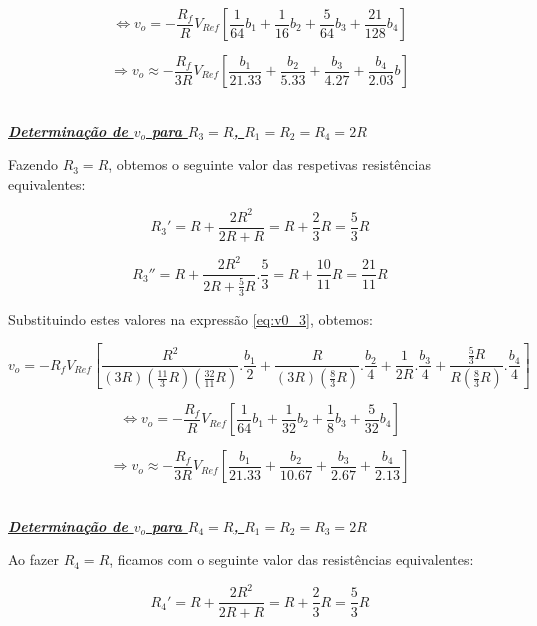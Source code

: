 \documentclass[a4paper,11pt]{report}
\begin{document}
$$\Leftrightarrow v_o=-\frac{R_f}{R}V_{Ref}\left[\frac{1}{64}b_1+\frac{1}{16}b_2+\frac{5}{64}b_3+\frac{21}{128}b_4\right]$$

\begin{equation}\label{eq:v0_2R}
\Rightarrow v_o \approx -\frac{R_f}{3R}V_{Ref}\left[\frac{b_1}{21.33}+\frac{b_2}{5.33}+\frac{b_3}{4.27}+\frac{b_4}{2.03}b\right]
\end{equation}\\

\par

\large\underline{\textit{\textbf{Determinação de $v_o$ para $R_3=R$, $R_1=R_2=R_4=2R$}}}\\
\par

Fazendo $R_3=R$, obtemos o seguinte valor das respetivas resistências equivalentes:

$$R_3'=R+\frac{2R^2}{2R+R}=R+\frac{2}{3}R=\frac{5}{3}R$$

$$R_3''=R+\frac{2R^2}{2R+\frac{5}{3}R}.\frac{5}{3}=R+\frac{10}{11}R=\frac{21}{11}R$$

Substituindo estes valores na expressão \ref{eq:v0_3}, obtemos:

$$v_o=-R_fV_{Ref}\left[\frac{R^2}{\left(3R\right)\left(\frac{11}{3}R\right)\left(\frac{32}{11}R\right)}.\frac{b_1}{2}+\frac{R}{\left(3R\right)\left(\frac{8}{3}R\right)}.\frac{b_2}{4}+\frac{1}{2R}.\frac{b_3}{4}+\frac{\frac{5}{3}R}{R\left(\frac{8}{3}R\right)}.\frac{b_4}{4}\right]$$

$$\Leftrightarrow v_o=-\frac{R_f}{R}V_{Ref}\left[\frac{1}{64}b_1+\frac{1}{32}b_2+\frac{1}{8}b_3+\frac{5}{32}b_4\right]$$

\begin{equation}\label{eq:v0_3R}
\Rightarrow v_o \approx -\frac{R_f}{3R}V_{Ref}\left[\frac{b_1}{21.33}+\frac{b_2}{10.67}+\frac{b_3}{2.67}+\frac{b_4}{2.13}\right]
\end{equation}\\

\par

\large\underline{\textit{\textbf{Determinação de $v_o$ para $R_4=R$, $R_1=R_2=R_3=2R$}}}\\
\par

Ao fazer $R_4=R$, ficamos com o seguinte valor das resistências equivalentes:

$$R_4'=R+\frac{2R^2}{2R+R}=R+\frac{2}{3}R=\frac{5}{3}R$$
\end{document}
